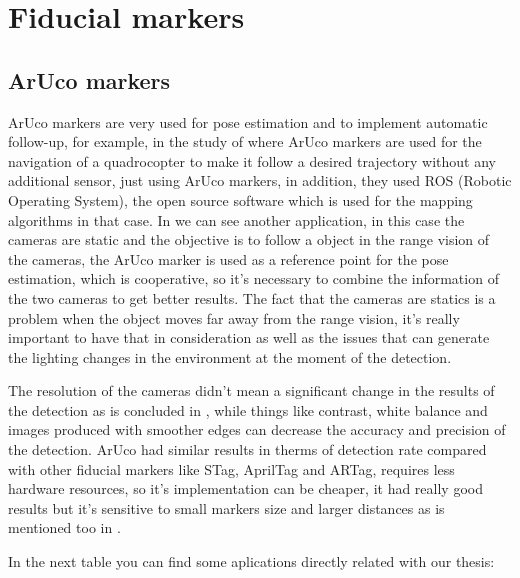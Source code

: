 \section{Fiducial markers}



\subsection{ArUco markers}
ArUco markers are very used for pose estimation and to implement automatic follow-up, for example, in the study of \citep{bacik2017autonomous} where ArUco markers are used for the navigation of a quadrocopter to make it follow a desired trajectory without any additional sensor, just using ArUco markers, in addition, they used ROS (Robotic Operating System), the open source software which is used for the mapping algorithms in that case. In \citep{jimenez2018sistema} we can see another application, in this case the cameras are static and the objective is to follow a object in the range vision of the cameras, the ArUco marker is used as a reference point for the pose estimation, which is cooperative, so it's necessary to combine the information of the two cameras to get better results. The fact that the cameras are statics is a problem when the object moves far away from the range vision, it's really important to have that in consideration as well as the issues that can generate the lighting changes in the environment at the moment of the detection. 

The resolution of the cameras didn't mean a significant change in the results of the detection as is concluded in \citep{kalaitzakis2021fiducial}, while things like contrast, white balance and images produced with smoother edges can decrease the accuracy and precision of the detection. ArUco had similar results in therms of detection rate compared with other fiducial markers like STag, AprilTag and ARTag, requires less hardware resources, so it’s implementation can be cheaper, it had really good results but it’s sensitive to small markers size and larger distances as is mentioned too in \citep{ferrao2018detection}.     


 
 
 
 
In the next table you can find some aplications directly related with our thesis:


